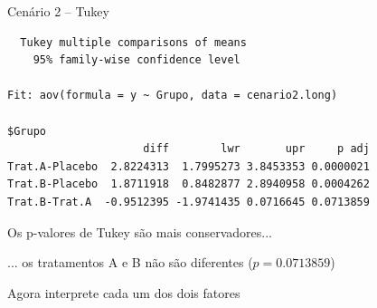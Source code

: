\documentclass{beamer}
\begin{document}
\begin{frame}[fragile]
  \begin{exampleblock}{Cenário 2 -- Tukey}
    \tiny
\begin{verbatim}
  Tukey multiple comparisons of means
    95% family-wise confidence level

Fit: aov(formula = y ~ Grupo, data = cenario2.long)

$Grupo
                     diff        lwr       upr     p adj
Trat.A-Placebo  2.8224313  1.7995273 3.8453353 0.0000021
Trat.B-Placebo  1.8711918  0.8482877 2.8940958 0.0004262
Trat.B-Trat.A  -0.9512395 -1.9741435 0.0716645 0.0713859
\end{verbatim}
  \end{exampleblock}
  \begin{block}{}
    \small
    Os p-valores de Tukey são mais conservadores...

    \bigskip
    ... os tratamentos A e B não são diferentes ($p=0.0713859$)
  \end{block}
\end{frame}

\begin{frame}
  \begin{center}
    Agora interprete cada um dos dois fatores
  \end{center}
\end{frame}

\end{document}
